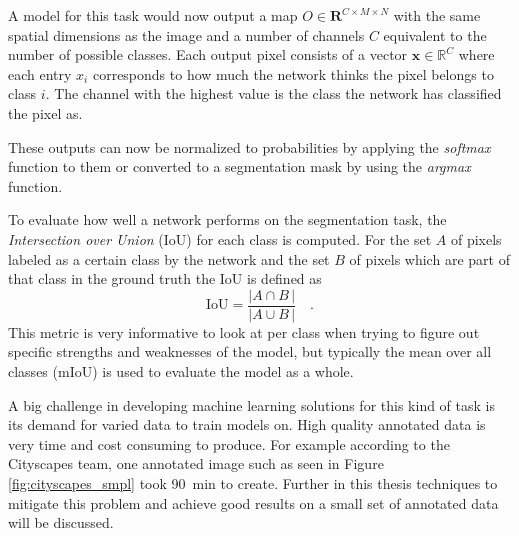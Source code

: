 A model for this task would now output a map $O\in\mathbf{R}^{C\times M\times N}$ with the same spatial dimensions as the image and a number of channels $C$ equivalent to the number of possible classes. Each output pixel consists of a vector $\mathbf{x}\in \mathbb{R}^C$ where each entry $x_i$ corresponds to how much the network thinks the pixel belongs to class $i$. The channel with the highest value is the class the network has classified the pixel as.

These outputs can now be normalized to probabilities by applying the \emph{softmax} function to them or converted to a segmentation mask by using the \emph{argmax} function.

To evaluate how well a network performs on the segmentation task, the \emph{Intersection over Union} (IoU) for each class is computed. For the set $A$ of pixels labeled as a certain class by the network and the set $B$ of pixels which are part of that class in the ground truth the IoU is defined as
$$
    \text{IoU} = \frac{\left|A\cap B \,\right|}{\left|A\cup B \,\right|}\quad .
$$
This metric is very informative to look at per class when trying to figure out specific strengths and weaknesses of the model, but typically the mean over all classes (mIoU) is used to evaluate the model as a whole.

A big challenge in developing machine learning solutions for this kind of task is its demand for varied data to train models on. High quality annotated data is very time and cost consuming to produce. 
For example according to the Cityscapes team, one annotated image such as seen in Figure \ref{fig:cityscapes_smpl} took \SI{90}{min} to create. 
Further in this thesis techniques to mitigate this problem and achieve good results on a small set of annotated data will be discussed.
